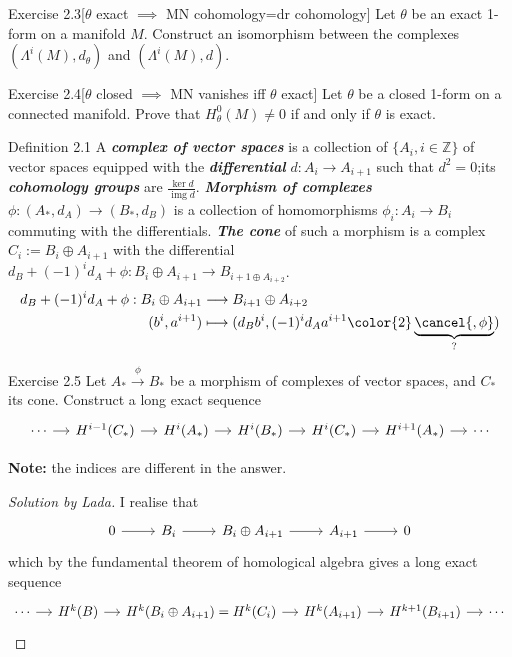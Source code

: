 \begin{thing4}{Exercise 2.3}[\(\theta\) exact \(\implies\) MN cohomology=dr cohomology]\label{exer:2.3}\leavevmode
Let \(\theta\) be an exact 1-form on a manifold \(M\). Construct an isomorphism between the complexes \((\Lambda^{i}(M),d_\theta)\) and \((\Lambda^{i}(M),d)\).
\end{thing4}

\begin{thing4}{Exercise 2.4}[\(\theta\) closed \(\implies\) MN vanishes iff \(\theta\) exact]\label{exer:2.4}\leavevmode
Let \(\theta\) be a closed 1-form on a connected manifold. Prove that \(H^0_\theta(M)\neq  0\) if and only if \(\theta\) is exact.
\end{thing4}

\begin{thing3}{Definition 2.1}\label{def:2.1}\leavevmode
	A \textit{\textbf{complex of vector spaces}} is a collection of \(\{A_i,i \in \mathbb{Z}\}\) of vector spaces equipped with the \textit{\textbf{differential}} \(d:A_i\to A_{i+1}\) such that \(d^2=0\);its \textit{\textbf{cohomology groups}} are \(\frac{\ker d}{\operatorname{img}d}\). \textit{\textbf{Morphism of complexes}} \(\phi:(A_*,d_A)\to (B_*,d_B)\) is a collection of homomorphisms \(\phi_i:A_i\to B_i\) commuting with the differentials. \textit{\textbf{The cone}} of such a morphism is a complex \(C_i:=B_i \oplus A_{i+1}\) with the differential \(d_B+(-1)^id_A+\phi:B_i \oplus A_{i+1}\to B_{i+1\oplus A_{i+2}}\).
\begin{align*}
	d_B+(-1)^id_A+\phi:B_i\oplus A_{i+1} &\longrightarrow B_{i+1}\oplus A_{i+2} \\
	(b^i,a^{i+1}) &\longmapsto (d_B b^i, (-1)^i d_A a^{i+1}{\color{2}\underbrace{\cancel{, \phi}}_{?}})
\end{align*}

\begin{thing4}{Exercise 2.5}\label{exer:2.5}\leavevmode
Let \(A_* \xrightarrow{\phi}B_*\) be a morphism of complexes of vector spaces, and \(C_*\) its cone. Construct a long exact sequence
\[\begin{tikzcd}[column sep=small]
	\cdots\arrow[r]&H^{i-1}(C_*)\arrow[r]&H^{i}(A_*)\arrow[r]&H^{i}(B_*)\arrow[r]&H^{i}(C_*)\arrow[r]&H^{i+1}(A_*)\arrow[r]&\cdots
\end{tikzcd}\]

\textbf{Note:} the indices are different in the answer.
\end{thing4}

\begin{proof}[Solution by Lada]\leavevmode
I realise that
\[\begin{tikzcd}0\arrow[r]&B_i\arrow[r]&B_i \oplus  A_{i+1}\arrow[r]&A_{i+1}\arrow[r]&0\end{tikzcd}\]
which by the fundamental theorem of homological algebra gives a long exact sequence
\[\begin{tikzcd}[column sep=small]
	\cdots\arrow[r]&H^{k}(B)\arrow[r]&H^{k}(B_i \oplus  A_{i+1})=H^{k}(C_i)\arrow[r]&H^{k}(A_{i+1})\arrow[r]&H^{k+1}(B_{i+1})\arrow[r]&\cdots
\end{tikzcd}\]
\end{proof}


\end{thing3}
